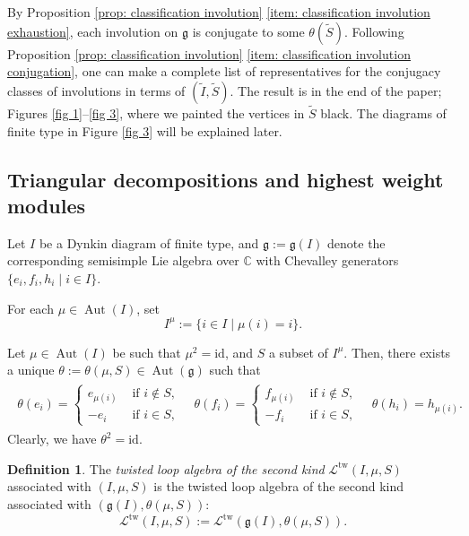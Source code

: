 \documentclass[12pt,a4paper]{amsart}
\theoremstyle{definition}
\newtheorem{defi}[thm]{Definition}
\numberwithin{equation}{subsection}
\begin{document}
By Proposition \ref{prop: classification involution} \eqref{item: classification involution exhaustion}, each involution on $\mathfrak{g}$ is conjugate to some $\theta(\tilde{S})$.
Following Proposition \ref{prop: classification involution} \eqref{item: classification involution conjugation}, one can make a complete list of representatives for the conjugacy classes of involutions in terms of $(\tilde{I}, \tilde{S})$.
The result is in the end of the paper; Figures \ref{fig 1}--\ref{fig 3}, where we painted the vertices in $\tilde{S}$ black.
The diagrams of finite type in Figure \ref{fig 3} will be explained later.












\subsection{Triangular decompositions and highest weight modules}
Let $I$ be a Dynkin diagram of finite type, and $\mathfrak{g} := \mathfrak{g}(I)$ denote the corresponding semisimple Lie algebra over $\mathbb{C}$ with Chevalley generators $\{ e_i,f_i,h_i \mid i \in I \}$.

For each $\mu \in \operatorname{Aut}(I)$, set
\[
  I^\mu := \{ i \in I \mid \mu(i) = i \}.
\]

Let $\mu \in \operatorname{Aut}(I)$ be such that $\mu^2 = \mathrm{id}$, and $S$ a subset of $I^\mu$.
Then, there exists a unique $\theta := \theta(\mu,S) \in \operatorname{Aut}(\mathfrak{g})$ such that
\begin{align}\label{eq: theta(I,sigma,J)}
  \begin{split}
    \theta(e_i) = \begin{cases}
      e_{\mu(i)} & \text{ if } i \notin S,\\
      -e_i & \text{ if } i \in S,
    \end{cases}
    \quad
    \theta(f_i) = \begin{cases}
      f_{\mu(i)} & \text{ if } i \notin S,\\
      -f_i & \text{ if } i \in S,
    \end{cases}
    \quad
    \theta(h_i) = h_{\mu(i)}.
  \end{split}
\end{align}
Clearly, we have $\theta^2 = \mathrm{id}$.

\begin{defi}
  The \emph{twisted loop algebra of the second kind} $\mathcal{L}^{\mathrm{tw}}(I,\mu,S)$ associated with $(I,\mu,S)$ is the twisted loop algebra of the second kind associated with $(\mathfrak{g}(I),\theta(\mu,S))$:
  \[
    \mathcal{L}^{\mathrm{tw}}(I,\mu,S) := \mathcal{L}^{\mathrm{tw}}(\mathfrak{g}(I),\theta(\mu,S)).
  \]
\end{defi}
\end{document}
